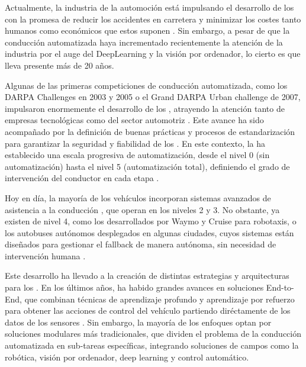 Actualmente, la industria de la automoción está impulsando el desarrollo de los  con la promesa de reducir los accidentes en carretera y minimizar los costes tanto humanos como económicos que estos suponen \cite{survey_AutomatedDriving1}. Sin embargo, a pesar de que la conducción automatizada haya incrementado recientemente la atención de la industria por el auge del DeepLearning y la visión por ordenador, lo cierto es que lleva presente más de 20 años.

Algunas de las primeras competiciones de conducción automatizada, como los DARPA Challenges en 2003 y 2005 o el Grand DARPA Urban challenge de 2007, impulsaron enormemente el desarrollo de los , atrayendo la atención tanto de empresas tecnológicas como del sector automotriz \cite{survey_AutomatedDriving2}. Este avance ha sido acompañado por la definición de buenas prácticas y procesos de estandarización para garantizar la seguridad y fiabilidad de los . En este contexto, la  ha establecido una escala progresiva de automatización, desde el nivel 0 (sin automatización) hasta el nivel 5 (automatización total), definiendo el grado de intervención del conductor en cada etapa \cite{AD_Technical_Standards}. 

Hoy en día, la mayoría de los vehículos incorporan sistemas avanzados de asistencia a la conducción , que operan en los niveles  2 y 3. No obstante, ya existen  de nivel 4, como los desarrollados por Waymo y Cruise para robotaxis, o los autobuses autónomos desplegados en algunas ciudades, cuyos sistemas están diseñados para gestionar el fallback de manera autónoma, sin necesidad de intervención humana \cite{fallback_strategy}.

Este desarrollo ha llevado a la creación de distintas estrategias y arquitecturas para los . En los últimos años, ha habido grandes avances en soluciones \mbox{End-to-End}, que combinan técnicas de aprendizaje profundo y aprendizaje por refuerzo para obtener las acciones de control del vehículo partiendo diréctamente de los datos de los sensores \cite{end_to_end_driving}. Sin embargo, la mayoría de los enfoques optan por soluciones modulares más tradicionales, que dividen el problema de la conducción automatizada en \mbox{sub-tareas} específicas, integrando soluciones de campos como la robótica, visión por ordenador, deep learning y control automático.

